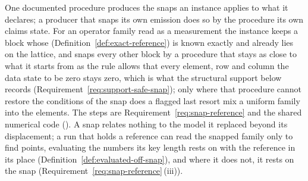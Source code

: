 
One documented procedure produces the snaps an instance applies to what it
declares; a producer that snaps its own emission does so by the procedure its
own claims state. For an operator family read as a measurement the instance
keeps a block whose  (Definition~\ref{def:exact-reference})
is known exactly and already lies on the lattice, and snaps every other block
by a procedure that stays as close to what it starts from as the rule allows
that every element, row and column the data state to be zero stays zero,
which is what the structural support below records
(Requirement~\ref{req:support-safe-snap}); only where that procedure cannot
restore the conditions of the snap does a flagged last resort mix a uniform
family into the elements. The steps are Requirement~\ref{req:snap-reference}
and the shared numerical code (). A snap
relates nothing to the model it replaced beyond its displacement; a run that
holds a reference can read the snapped family only to find points,
evaluating the numbers its key length rests on with the reference in its
place (Definition~\ref{def:evaluated-off-snap}), and where it does not, it
rests on the snap (Requirement~\ref{req:snap-reference}\,(iii)).


